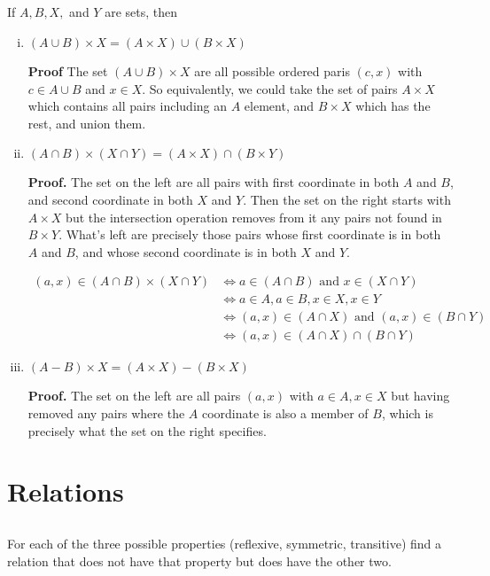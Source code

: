 \documentclass{article}
\newcommand{\tand}{\text{ and }}
\begin{document}
\subsection{} If $A, B, X,$ and $Y$ are sets, then
\begin{enumerate}[(i)]
    \item $(A \cup B) \times X = (A \times X) \cup (B \times X)$

    \textbf{Proof} The set $(A \cup B) \times X$ are all possible ordered paris $(c, x)$ with $c \in A \cup B$ and $x \in X$. So equivalently, we could take the set of pairs $A \times X$ which contains all pairs including an $A$ element, and $B \times X$ which has the rest, and union them.

    \item $(A \cap B) \times (X \cap Y) = (A \times X) \cap (B \times Y)$
    
    \textbf{Proof.} The set on the left are all pairs with first coordinate in both $A$ and $B$, and second coordinate in both $X$ and $Y$. Then the set on the right starts with $A \times X$ but the intersection operation removes from it any pairs not found in $B \times Y$. What's left are precisely those pairs whose first coordinate is in both $A$ and $B$, and whose second coordinate is in both $X$ and $Y$.

    \begin{align*}
        (a, x) \in (A \cap B) \times (X \cap Y) &\iff a \in (A \cap B) \tand x \in (X \cap Y)\\
        &\iff a \in A, a \in B, x \in X, x \in Y\\
        &\iff (a, x) \in (A \cap X) \tand (a, x) \in (B \cap Y)\\
        &\iff (a, x) \in (A \cap X) \cap (B \cap Y) 
    \end{align*}
    
    \item $(A - B) \times X = (A \times X) - (B \times X)$
    
    \textbf{Proof.} The set on the left are all pairs $(a, x)$ with $a \in A, x \in X$ but having removed any pairs where the $A$ coordinate is also a member of $B$, which is precisely what the set on the right specifies.
\end{enumerate}
    
\section{Relations}

\subsection{} For each of the three possible properties (reflexive, symmetric, transitive) find a relation that does not have that property but does have the other two. 
\end{document}
